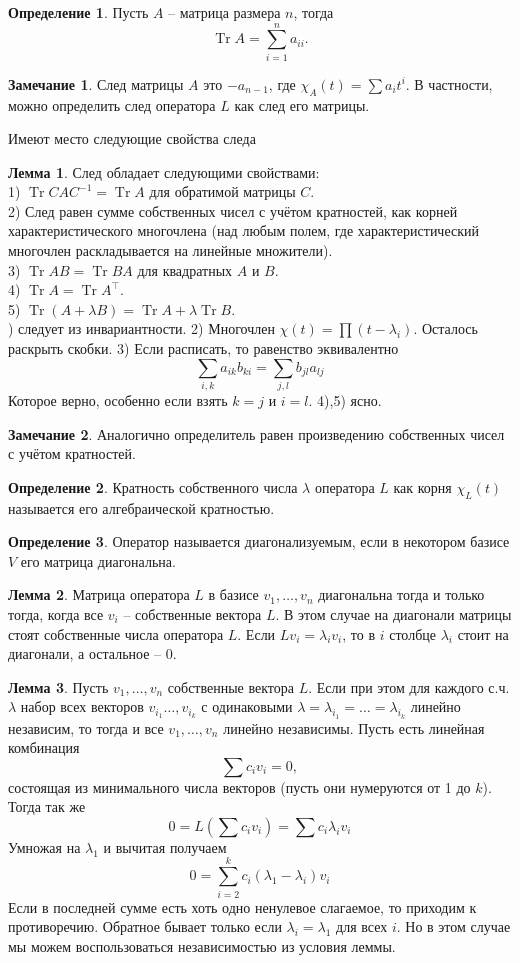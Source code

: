 \documentclass[10pt,a4paper,oneside]{book}
\theoremstyle{definition}
\newtheorem*{rem}{Замечание}
\newtheorem*{defn}{Определение}
\newtheorem{lem}{Лемма}
\newcommand{\Tr}{\operatorname{Tr}}
\newcommand{\tr}{\operatorname{Tr}}
\def\dfn{\begin{defn}}
\def\edfn{\end{defn}}
\def\lm{\begin{lem}}
\def\elm{\end{lem}}
\def\rm{\begin{rem}}
\def\erm{\end{rem}}
\begin{document}
\dfn Пусть $A$ -- матрица размера $n$, тогда $$\Tr A=\sum_{i=1}^n a_{ii}.$$
\edfn

\rm След матрицы $A$ это $-a_{n-1}$, где $\chi_A(t)= \sum a_{i}t^i$. В частности, можно определить след  оператора $L$ как след его матрицы.
\erm

Имеют место следующие свойства следа

\lm След обладает следующими свойствами: \\
1) $\tr CAC^{-1}= \tr A$ для обратимой матрицы $C$.\\
2) След равен сумме собственных чисел с учётом кратностей, как корней характеристического многочлена (над любым полем, где характеристический многочлен раскладывается на линейные множители).\\
3) $\tr AB = \tr BA$ для квадратных $A$ и $B$.\\
4) $\tr A= \tr A^{\top}$.\\
5) $\tr( A + \lambda B) = \tr A + \lambda \tr B$.\\
) следует из инвариантности. 2) Многочлен $\chi(t)=\prod (t-\lambda_i)$. Осталось раскрыть скобки. 3) Если расписать, то равенство эквивалентно
$$\sum_{i,k} a_{ik}b_{ki}=\sum_{j,l} b_{jl}a_{lj}$$
Которое верно, особенно если взять $k=j$ и $i=l$. 4),5) ясно. \endproof
\elm

\rm Аналогично определитель равен произведению собственных чисел с учётом кратностей.
\erm

\dfn Кратность собственного числа $\lambda$ оператора $L$ как корня $\chi_L(t)$ называется его алгебраической кратностью.
\edfn









\dfn Оператор называется диагонализуемым,  если в некотором базисе $V$ его матрица диагональна.
\edfn

\lm Матрица оператора $L$ в базисе $v_1,\dots,v_n$ диагональна тогда и только тогда, когда все $v_i$ -- собственные вектора $L$. В этом случае на диагонали матрицы стоят собственные числа оператора $L$.
\proof Если $Lv_i=\lambda_iv_i$, то в $i$ столбце $\lambda_i$ стоит на диагонали, а остальное -- $0$.
\endproof
\elm

\lm Пусть $v_1,\dots,v_n$ собственные вектора $L$. Если при этом для каждого с.ч. $\lambda$ набор всех векторов $v_{i_1}\dots,v_{i_k}$ с одинаковыми $\lambda=\lambda_{i_1}=\dots=\lambda_{i_k}$  линейно независим, то тогда и все $v_1,\dots,v_n$ линейно независимы.
\proof Пусть есть линейная комбинация $$\sum c_i v_i=0,$$
состоящая из минимального числа векторов (пусть они нумеруются от 1 до $k$). Тогда так же
$$0=L\left(\sum c_i v_i\right)= \sum c_i \lambda_i v_i$$
Умножая на $\lambda_1$ и вычитая получаем $$0=\sum_{i=2}^k c_i(\lambda_1-\lambda_i)v_i$$
Если в последней сумме есть хоть одно ненулевое слагаемое, то приходим к противоречию. Обратное бывает только если $\lambda_i=\lambda_1$ для всех $i$. Но в этом случае мы можем воспользоваться независимостью из условия леммы.
\endproof
\elm
\end{document}
